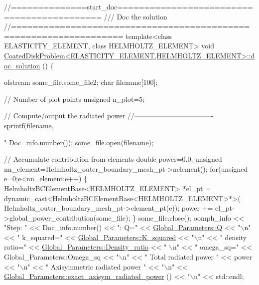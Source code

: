  
\begin{DoxyCodeInclude}
\textcolor{comment}{//==============start\_doc===========================================}
\textcolor{comment}{/// Doc the solution}
\textcolor{comment}{}\textcolor{comment}{//==================================================================}
\textcolor{keyword}{template}<\textcolor{keyword}{class} ELASTICITY\_ELEMENT, \textcolor{keyword}{class} HELMHOLTZ\_ELEMENT>
\textcolor{keywordtype}{void} \hyperlink{classCoatedDiskProblem_af8e103d494f526c0e24c0c4ccef4ea6b}{CoatedDiskProblem<ELASTICITY\_ELEMENT,HELMHOLTZ\_ELEMENT>::doc\_solution}
      ()
\{

 ofstream some\_file,some\_file2;
 \textcolor{keywordtype}{char} filename[100];

 \textcolor{comment}{// Number of plot points}
 \textcolor{keywordtype}{unsigned} n\_plot=5; 

 \textcolor{comment}{// Compute/output the radiated power}
 \textcolor{comment}{//----------------------------------}
 sprintf(filename,\textcolor{stringliteral}{"%
         Doc\_info.number());
 some\_file.open(filename);

 \textcolor{comment}{// Accumulate contribution from elements}
 \textcolor{keywordtype}{double} power=0.0;
 \textcolor{keywordtype}{unsigned} nn\_element=Helmholtz\_outer\_boundary\_mesh\_pt->nelement(); 
 \textcolor{keywordflow}{for}(\textcolor{keywordtype}{unsigned} e=0;e<nn\_element;e++)
  \{
   HelmholtzBCElementBase<HELMHOLTZ\_ELEMENT> *el\_pt = 
    \textcolor{keyword}{dynamic\_cast<}HelmholtzBCElementBase<HELMHOLTZ\_ELEMENT>*\textcolor{keyword}{>}(
     Helmholtz\_outer\_boundary\_mesh\_pt->element\_pt(e)); 
   power += el\_pt->global\_power\_contribution(some\_file);
  \}
 some\_file.close();
 oomph\_info << \textcolor{stringliteral}{"Step: "} << Doc\_info.number() 
            << \textcolor{stringliteral}{": Q="} << \hyperlink{namespaceGlobal__Parameters_a7814fddf663e56168174a42d2cd6b4c1}{Global\_Parameters::Q}  << \textcolor{stringliteral}{"\(\backslash\)n"}
            << \textcolor{stringliteral}{" k\_squared="} << \hyperlink{namespaceGlobal__Parameters_a91a3fa265abaf9e724c668ee800ffb29}{Global\_Parameters::K\_squared}  << \textcolor{stringliteral}{"\(\backslash\)n"}
            << \textcolor{stringliteral}{" density ratio="} << \hyperlink{namespaceGlobal__Parameters_a517d4c31b8bce6563c2f605266dd9679}{Global\_Parameters::Density\_ratio}  << \textcolor{stringliteral}{"
      \(\backslash\)n"}
            << \textcolor{stringliteral}{" omega\_sq="} << Global\_Parameters::Omega\_sq  << \textcolor{stringliteral}{"\(\backslash\)n"}
            << \textcolor{stringliteral}{" Total radiated power "} << power  << \textcolor{stringliteral}{"\(\backslash\)n"}
            << \textcolor{stringliteral}{" Axisymmetric radiated power "}  << \textcolor{stringliteral}{"\(\backslash\)n"}
            <<  \hyperlink{namespaceGlobal__Parameters_a79131fd1bf3eb1ab080c21c2d98a92d5}{Global\_Parameters::exact\_axisym\_radiated\_power}
      ()  << \textcolor{stringliteral}{"\(\backslash\)n"}
            << std::endl; 


}
\end{DoxyCodeInclude}
